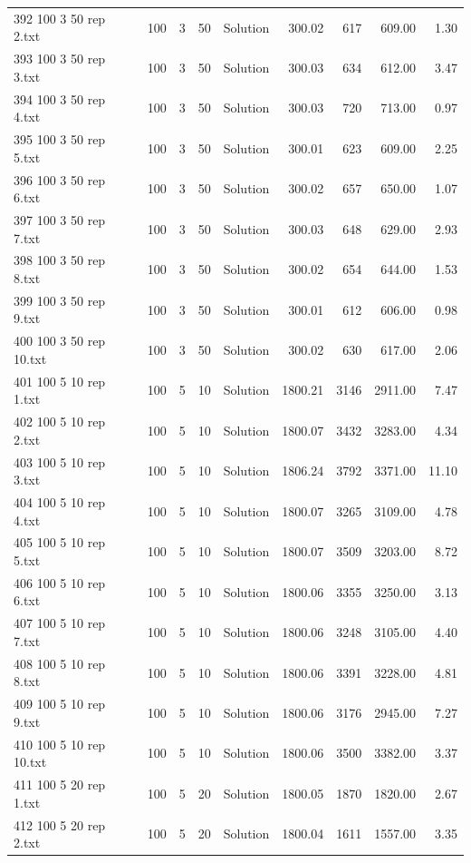 \begin{longtable}{lrrllrrrr}
392 100 3 50 rep 2.txt & 100 & 3 & 50 & Solution & 300.02 & 617 & 609.00 &  1.30\\
393 100 3 50 rep 3.txt & 100 & 3 & 50 & Solution & 300.03 & 634 & 612.00 &  3.47\\
394 100 3 50 rep 4.txt & 100 & 3 & 50 & Solution & 300.03 & 720 & 713.00 &  0.97\\
395 100 3 50 rep 5.txt & 100 & 3 & 50 & Solution & 300.01 & 623 & 609.00 &  2.25\\
396 100 3 50 rep 6.txt & 100 & 3 & 50 & Solution & 300.02 & 657 & 650.00 &  1.07\\
397 100 3 50 rep 7.txt & 100 & 3 & 50 & Solution & 300.03 & 648 & 629.00 &  2.93\\
398 100 3 50 rep 8.txt & 100 & 3 & 50 & Solution & 300.02 & 654 & 644.00 &  1.53\\
399 100 3 50 rep 9.txt & 100 & 3 & 50 & Solution & 300.01 & 612 & 606.00 &  0.98\\
400 100 3 50 rep 10.txt & 100 & 3 & 50 & Solution & 300.02 & 630 & 617.00 &  2.06\\
401 100 5 10 rep 1.txt & 100 & 5 & 10 & Solution & 1800.21 & 3146 & 2911.00 &  7.47\\
402 100 5 10 rep 2.txt & 100 & 5 & 10 & Solution & 1800.07 & 3432 & 3283.00 &  4.34\\
403 100 5 10 rep 3.txt & 100 & 5 & 10 & Solution & 1806.24 & 3792 & 3371.00 & 11.10\\
404 100 5 10 rep 4.txt & 100 & 5 & 10 & Solution & 1800.07 & 3265 & 3109.00 &  4.78\\
405 100 5 10 rep 5.txt & 100 & 5 & 10 & Solution & 1800.07 & 3509 & 3203.00 &  8.72\\
406 100 5 10 rep 6.txt & 100 & 5 & 10 & Solution & 1800.06 & 3355 & 3250.00 &  3.13\\
407 100 5 10 rep 7.txt & 100 & 5 & 10 & Solution & 1800.06 & 3248 & 3105.00 &  4.40\\
408 100 5 10 rep 8.txt & 100 & 5 & 10 & Solution & 1800.06 & 3391 & 3228.00 &  4.81\\
409 100 5 10 rep 9.txt & 100 & 5 & 10 & Solution & 1800.06 & 3176 & 2945.00 &  7.27\\
410 100 5 10 rep 10.txt & 100 & 5 & 10 & Solution & 1800.06 & 3500 & 3382.00 &  3.37\\
411 100 5 20 rep 1.txt & 100 & 5 & 20 & Solution & 1800.05 & 1870 & 1820.00 &  2.67\\
412 100 5 20 rep 2.txt & 100 & 5 & 20 & Solution & 1800.04 & 1611 & 1557.00 &  3.35\\

\end{longtable}
